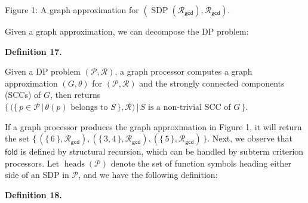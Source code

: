 \documentclass[10pt,a4paper]{amsart}
\begin{document}
Figure 1: A graph approximation for $(\operatorname{SDP}(\mathcal{R}_{\mathsf{gcd}}),\mathcal{R}_{\mathsf{gcd}})$.\par
 
 
 
Given a graph approximation, we can decompose the DP problem:\par
 
 
 
\par\medskip\noindent\textbf{Definition 17.}\par
 
 
Given a DP problem $(\mathcal{P},\mathcal{R})$, a graph processor computes a graph approximation $(G,\theta)$ for $(\mathcal{P},\mathcal{R})$ and the strongly connected components (SCCs) of $G$, then returns $\{\,(\{\,p\in\mathcal{P}\,|\,\theta(p)\text{ belongs to }S\,\},\mathcal{R})\,|\,S\text{ is a non-trivial SCC of }G\,\}$.\par
 
 
 
 
If a graph processor produces the graph approximation in Figure 1, it will return the set $\{\,(\{\,\text{6}\,\},\mathcal{R}_{\mathsf{gcd}}),(\{\,\text{3},\text{4}\,\},\mathcal{R}_{\mathsf{gcd}}),(\{\,\text{5}\,\},\mathcal{R}_{\mathsf{gcd}})\,\}$. Next, we observe that $\mathsf{fold}$ is defined by structural recursion, which can be handled by subterm criterion processors. Let $\operatorname{heads}(\mathcal{P})$ denote the set of function symbols heading either side of an SDP in $\mathcal{P}$, and we have the following definition:\par
 
 
 
\par\medskip\noindent\textbf{Definition 18.}\par
 
 
\end{document}
